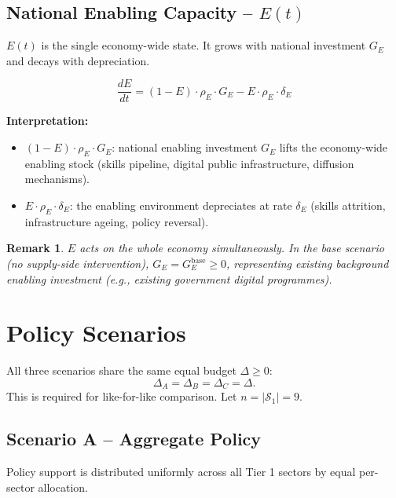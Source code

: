 \documentclass[11pt,a4paper]{article}
\newtheorem{remark}{Remark}
\begin{document}
\subsection{National Enabling Capacity -- \texorpdfstring{$E(t)$}{E(t)}}

$E(t)$ is the single economy-wide state. It grows with national investment $G_E$ and decays with depreciation.

\begin{equation}
\boxed{
\frac{dE}{dt}
= (1 - E)\cdot\rho_E\cdot G_E
- E\cdot\rho_E\cdot\delta_E
}
\label{eq:E}
\end{equation}

\textbf{Interpretation:}
\begin{itemize}
  \item $(1 - E)\cdot\rho_E\cdot G_E$: national enabling investment $G_E$ lifts the economy-wide enabling stock (skills pipeline, digital public infrastructure, diffusion mechanisms).
  \item $E\cdot\rho_E\cdot\delta_E$: the enabling environment depreciates at rate $\delta_E$ (skills attrition, infrastructure ageing, policy reversal).
\end{itemize}

\begin{remark}
$E$ acts on the whole economy simultaneously. In the base scenario (no supply-side intervention), $G_E = G_E^{\text{base}} \geq 0$, representing existing background enabling investment (e.g., existing government digital programmes).
\end{remark}

\section{Policy Scenarios}

All three scenarios share the same equal budget $\Delta \geq 0$:
\[
\Delta_A = \Delta_B = \Delta_C = \Delta.
\]
This is required for like-for-like comparison. Let $n = |\mathcal{S}_1| = 9$.

\subsection{Scenario A -- Aggregate Policy}

Policy support is distributed uniformly across all Tier 1 sectors by equal per-sector allocation.
\end{document}
